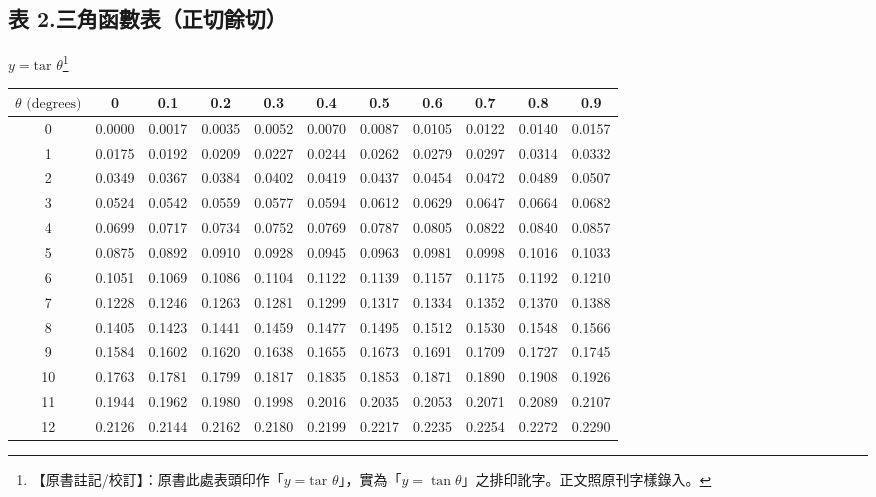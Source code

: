 \subsection*{表 2.\quad 三角函數表（正切餘切）}
\begin{center} $y = \text{tar }\theta$\label{note:b3s-a3-p287-tar}\footnote{【原書註記/校訂】：原書此處表頭印作「$y = \text{tar }\theta$」，實為「$y = \tan\theta$」之排印訛字。正文照原刊字樣錄入。} \end{center}
{\centering\fontsize{7.5pt}{8.8pt}\selectfont\setlength{\tabcolsep}{3.5pt}\renewcommand{\arraystretch}{0.96}
\begin{tabular}{|c|cccccccccc|}
\hline
$\theta\text{ (degrees)}$ & 0 & 0.1 & 0.2 & 0.3 & 0.4 & 0.5 & 0.6 & 0.7 & 0.8 & 0.9 \\ \hline
0 & 0.0000 & 0.0017 & 0.0035 & 0.0052 & 0.0070 & 0.0087 & 0.0105 & 0.0122 & 0.0140 & 0.0157 \\
1 & 0.0175 & 0.0192 & 0.0209 & 0.0227 & 0.0244 & 0.0262 & 0.0279 & 0.0297 & 0.0314 & 0.0332 \\
2 & 0.0349 & 0.0367 & 0.0384 & 0.0402 & 0.0419 & 0.0437 & 0.0454 & 0.0472 & 0.0489 & 0.0507 \\
3 & 0.0524 & 0.0542 & 0.0559 & 0.0577 & 0.0594 & 0.0612 & 0.0629 & 0.0647 & 0.0664 & 0.0682 \\
4 & 0.0699 & 0.0717 & 0.0734 & 0.0752 & 0.0769 & 0.0787 & 0.0805 & 0.0822 & 0.0840 & 0.0857 \\
\hline
5 & 0.0875 & 0.0892 & 0.0910 & 0.0928 & 0.0945 & 0.0963 & 0.0981 & 0.0998 & 0.1016 & 0.1033 \\
6 & 0.1051 & 0.1069 & 0.1086 & 0.1104 & 0.1122 & 0.1139 & 0.1157 & 0.1175 & 0.1192 & 0.1210 \\
7 & 0.1228 & 0.1246 & 0.1263 & 0.1281 & 0.1299 & 0.1317 & 0.1334 & 0.1352 & 0.1370 & 0.1388 \\
8 & 0.1405 & 0.1423 & 0.1441 & 0.1459 & 0.1477 & 0.1495 & 0.1512 & 0.1530 & 0.1548 & 0.1566 \\
9 & 0.1584 & 0.1602 & 0.1620 & 0.1638 & 0.1655 & 0.1673 & 0.1691 & 0.1709 & 0.1727 & 0.1745 \\
\hline
10 & 0.1763 & 0.1781 & 0.1799 & 0.1817 & 0.1835 & 0.1853 & 0.1871 & 0.1890 & 0.1908 & 0.1926 \\
11 & 0.1944 & 0.1962 & 0.1980 & 0.1998 & 0.2016 & 0.2035 & 0.2053 & 0.2071 & 0.2089 & 0.2107 \\
12 & 0.2126 & 0.2144 & 0.2162 & 0.2180 & 0.2199 & 0.2217 & 0.2235 & 0.2254 & 0.2272 & 0.2290 \\

\end{tabular}}
